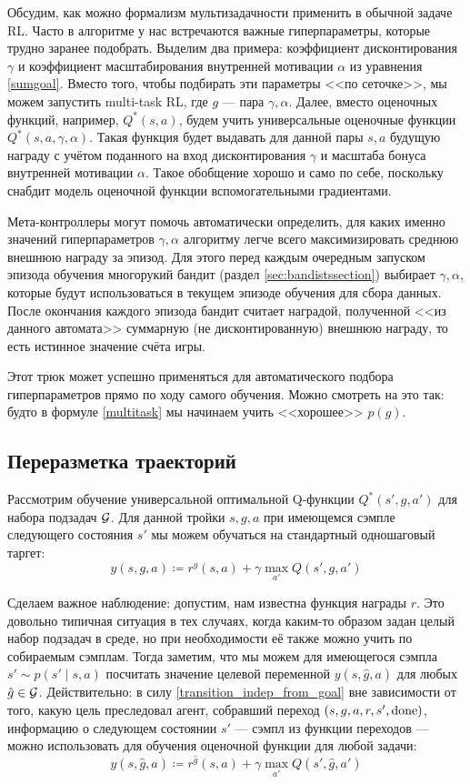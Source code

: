 Обсудим, как можно формализм мультизадачности применить в обычной задаче RL. Часто в алгоритме у нас встречаются важные гиперпараметры, которые трудно заранее подобрать. Выделим два примера: коэффициент дисконтирования $\gamma$ и коэффициент масштабирования внутренней мотивации $\alpha$ из уравнения \eqref{sumgoal}. Вместо того, чтобы подбирать эти параметры <<по сеточке>>, мы можем запустить multi-task RL, где $g$ --- пара $\gamma, \alpha$. Далее, вместо оценочных функций, например, $Q^*(s, a)$, будем учить универсальные оценочные функции $Q^*(s, a, \gamma, \alpha)$. Такая функция будет выдавать для данной пары $s, a$ будущую награду с учётом поданного на вход дисконтирования $\gamma$ и масштаба бонуса внутренней мотивации $\alpha$. Такое обобщение хорошо и само по себе, поскольку снабдит модель оценочной функции вспомогательными градиентами.

Мета-контроллеры могут помочь автоматически определить, для каких именно значений гиперпараметров $\gamma, \alpha$ алгоритму легче всего максимизировать среднюю внешнюю награду за эпизод. Для этого перед каждым очередным запуском эпизода обучения многорукий бандит (раздел \ref{sec:bandistssection}) выбирает $\gamma, \alpha$, которые будут использоваться в текущем эпизоде обучения для сбора данных. После окончания каждого эпизода бандит считает наградой, полученной <<из данного автомата>> суммарную (не дисконтированную) внешнюю награду, то есть истинное значение счёта игры.

Этот трюк может успешно применяться для автоматического подбора гиперпараметров прямо по ходу самого обучения. Можно смотреть на это так: будто в формуле \eqref{multitask} мы начинаем учить <<хорошее>> $p(g)$.

\subsection{Переразметка траекторий}\label{subsec:hindsight}

Рассмотрим обучение универсальной оптимальной Q-функции $Q^*(s', g, a')$ для набора подзадач $\mathcal{G}$. Для данной тройки $s, g, a$ при имеющемся сэмпле следующего состояния $s'$ мы можем обучаться на стандартный одношаговый таргет:
$$y(s, g, a) \coloneqq r^g(s, a) + \gamma \max_{a'} Q(s', g, a')$$

Сделаем важное наблюдение: допустим, нам известна функция награды $r$. Это довольно типичная ситуация в тех случаях, когда каким-то образом задан целый набор подзадач в среде, но при необходимости её также можно учить по собираемым сэмплам. Тогда заметим, что мы можем для имеющегося сэмпла $s' \sim p(s' \mid s, a)$ посчитать значение целевой переменной $y(s, \hat{g}, a)$ для любых $\hat{g} \in \mathcal{G}$. Действительно: в силу \eqref{transition_indep_from_goal} вне зависимости от того, какую цель преследовал агент, собравший переход $(s, g, a, r, s', \mathrm{done})$, информацию о следующем состоянии $s'$ --- сэмпл из функции переходов --- можно использовать для обучения оценочной функции для любой задачи:
$$y(s, \hat{g}, a) \coloneqq r^{\hat{g}}(s, a) + \gamma \max_{a'} Q(s', \hat{g}, a')$$

